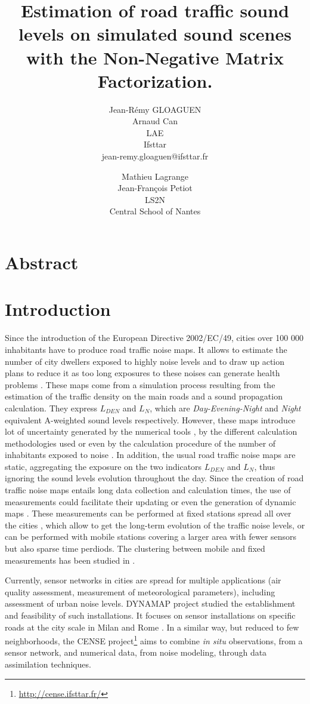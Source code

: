 \documentclass[twocolumn,a4paper,10pt]{article}
\title{Estimation of road traffic sound levels on simulated sound scenes with the Non-Negative Matrix Factorization.}
\author{
    Jean-Rémy GLOAGUEN\\
    Arnaud Can\\
    LAE\\
    Ifsttar\\
    jean-remy.gloaguen@ifsttar.fr
  \and
    Mathieu Lagrange\\
	Jean-François Petiot \\
    LS2N\\
    Central School of Nantes\\
}
\date{}
\begin{document}
\maketitle

\section*{Abstract}

\section{Introduction}
Since the introduction of the European Directive 2002/EC/49, cities over 100 000 inhabitants have to produce road traffic noise maps. It allows to estimate the number of city dwellers exposed to highly noise levels and to draw up action plans to reduce it as too long exposures to these noises can generate health problems \cite{who_burden_2017}. These maps come from a simulation process resulting from the estimation of the traffic density on the main roads and a sound propagation calculation. They express $L_ {DEN}$ and $L_N$, which are \textit{Day-Evening-Night} and \textit{Night} equivalent A-weighted sound levels respectively. However, these maps introduce lot of uncertainty generated by the numerical tools \cite{van_leeuwen_noise_2015}, by the different calculation methodologies used \cite{leroy_uncertainty_2010}\cite{garg_critical_2014} or even by the calculation procedure of the number of inhabitants exposed to noise \cite{king_implementation_2011}. In addition, the usual road traffic noise maps are static, aggregating the exposure on the two indicators $L_{DEN}$ and $L_N$, thus ignoring the sound levels evolution throughout the day. Since the creation of road traffic noise maps entails long data collection and calculation times, the use of measurements could facilitate their updating or even the generation of dynamic maps \cite{wei_dynamic_2016}. These measurements can be performed at fixed stations spread all over the cities \cite{Mioduszewski} \cite{mietlicki2012innovative}, which allow to get the long-term evolution of the traffic noise levels, or can be performed with  mobile stations \cite{can_exploring_2012} \cite{manvell2004sadmam} covering a larger area with fewer sensors but also sparse time perdiods. The clustering between mobile and fixed measurements has been studied in \cite{can_measurement_2014}.

Currently, sensor networks in cities are spread for multiple applications (air quality assessment, measurement of meteorological parameters), including assessment of urban noise levels. DYNAMAP project \cite{dynamap_2016} studied the establishment and feasibility of such installations. It focuses on sensor installations on specific roads at the city scale in Milan and Rome \cite{bellucci_life_2017}. In a similar way, but reduced to few neighborhoods, the CENSE project\footnote{\url{http://cense.ifsttar.fr/}} \cite{} aims to combine \textit{in situ} observations, from a sensor network, and numerical data, from noise modeling, through data assimilation techniques.
\end{document}
